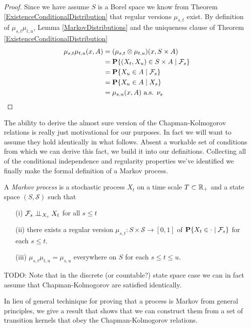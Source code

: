 \begin{proof}
Since we have assume $S$ is a Borel space we know from Theorem \ref{ExistenceConditionalDistribution} that regular
versions $\mu_{s,t}$ exist.  By definition of $\mu_{s,t} \mu_{t,u}$, Lemma
\ref{MarkovDistributions} and the uniqueness clause of Theorem \ref{ExistenceConditionalDistribution}
\begin{align*}
\mu_{s,t} \mu_{t,u}(x, A) &= 
(\mu_{s,t} \otimes \mu_{t,u})(x, S \times A) \\
&= \cprobability{\mathcal{F}_s}{(X_t, X_u) \in S \times A} \\
&=\cprobability{\mathcal{F}_s}{ X_u \in A} \\
&=\cprobability{X_s}{ X_u \in A} \\
&= \mu_{s,u}(x, A) \text{  a.s. $\nu_s$}
\end{align*}
\end{proof}

The ability to derive the almost sure version of the
Chapman-Kolmogorov relations is really just motivational for our
purposes.  In fact we will want to assume they hold identically in
what follows.  Absent a workable set of conditions from which we can
derive this fact, we build it into our definitions.  Collecting all of
the conditional independence and regularity properties we've
identified we finally make the formal definition of a Markov process.
\begin{defn}
A \emph{Markov process} is a stochastic process $X_t$ on a time scale $T
\subset \reals_+$ and a state space $(S, \mathcal{S})$ such that 
\begin{itemize}
\item[(i)]$\cindependent{\mathcal{F}_s}{X_t}{X_s}$ for all $s \leq t$
\item[(ii)]there exists a regular version $\mu_{s,t} :
  S \times \mathcal{S} \to [0,1]$ of $\cprobability{\mathcal{F}_s}{X_t
    \in \cdot}$ for each $s \leq t$.
\item[(iii)]$\mu_{s,t} \mu_{t,u} = \mu_{s,u}$ everywhere on $S$ for
  each $s \leq t \leq u$.
\end{itemize}
\end{defn}

TODO: Note that in the discrete (or countable?) state space case we
can in fact assume that Chapman-Kolmogorov are satisfied identically.

In lieu of general techinique for proving that a process is Markov
from general principles, we give a result that shows that we can
construct them from a set of transition kernels that obey the
Chapman-Kolmogorov relations.


